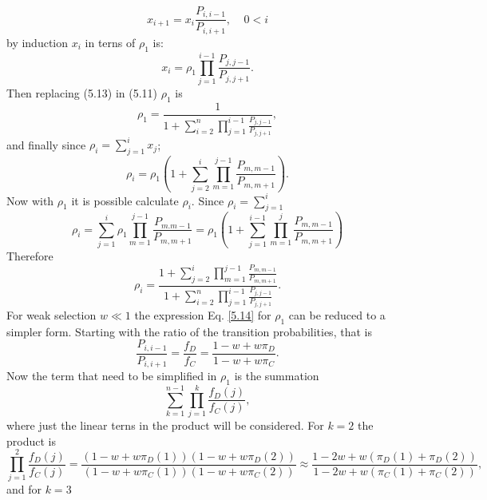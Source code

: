 \begin{equation}
x_{i+1}=x_{i}\frac{P_{i,i-1}}{P_{i,i+1}}, \;\;\;\; 0<i
\end{equation}
by induction $x_{i}$ in terns of $\rho_{1}$ is:
\begin{equation}
x_{i}=\rho_{1}\prod\limits_{j=1}^{i-1}\frac{P_{j,j-1}}{P_{j,j+1}}.
\end{equation}
Then replacing (5.13) in (5.11) $\rho_1$ is
\begin{equation}\label{5.14}
\rho_1 =\frac{1}{1+\sum\limits_{i=2}^{n}\prod\limits_{j=1}^{i-1}\frac{P_{j,j-1}}{P_{j,j+1}}},
\end{equation} 
and finally since $\rho_i= \sum\limits_{j=1}^{i}x_j$;
\begin{equation}
\rho_i = \rho_1(1+\sum\limits_{j=2}^{i}\prod\limits_{m=1}^{j-1}\frac{P_{m,m-1}}{P_{m,m+1}}).
\end{equation} 
Now with $\rho_1$ it is possible calculate $\rho_i$. Since $\rho_i=\sum\limits_{j=1}^{i}$
\begin{equation}
\rho_i =\sum\limits_{j=1}^{i}\rho_{1}\prod\limits_{m=1}^{j-1}\frac{P_{m.m-1}}{P_{m,m+1}}=\rho_{1}\left( 1+ \sum\limits_{j=1}^{i-1}\prod\limits_{m=1}^{j}\frac{P_{m,m-1}}{P_{m,m+1}}\right)
\end{equation}
Therefore
\begin{equation}
\rho_i = \frac{1+\sum\limits_{j=2}^{i}\prod\limits_{m=1}^{j-1}\frac{P_{m,m-1}}{P_{m,m+1}}}{1+\sum\limits_{i=2}^{n}\prod\limits_{j=1}^{i-1}\frac{P_{j,j-1}}{P_{j,j+1}}}.
\end{equation}
For weak selection $w\ll 1$ the  expression Eq. \eqref{5.14} for $\rho_1$ can be reduced to a simpler form. Starting with the ratio of the transition probabilities, that is
\begin{equation}
\frac{P_{i,i-1}}{P_{i,i+1}}=\frac{f_D}{f_C}=\frac{1-w+w\pi_D}{1-w+w\pi_C}.
\end{equation} 
Now the term that need to be simplified in $\rho_1$ is the summation
\begin{equation}
\sum\limits_{k=1}^{n-1}\prod\limits_{j=1}^{k}\frac{f_D(j)}{f_C(j)},
\end{equation}
where just the linear terns in the product will be considered. For $k=2$ the product is 
\begin{equation}
\prod\limits_{j=1}^{2}\frac{f_D(j)}{f_C(j)}=\frac{(1-w+w\pi_D(1))(1-w+w\pi_D(2))}{(1-w+w\pi_C(1))(1-w+w\pi_C(2))}\approx \frac{1-2w+w(\pi_D(1)+\pi_D(2))}{1-2w+w(\pi_C(1)+\pi_C(2))},
\end{equation}
and for $k=3$
